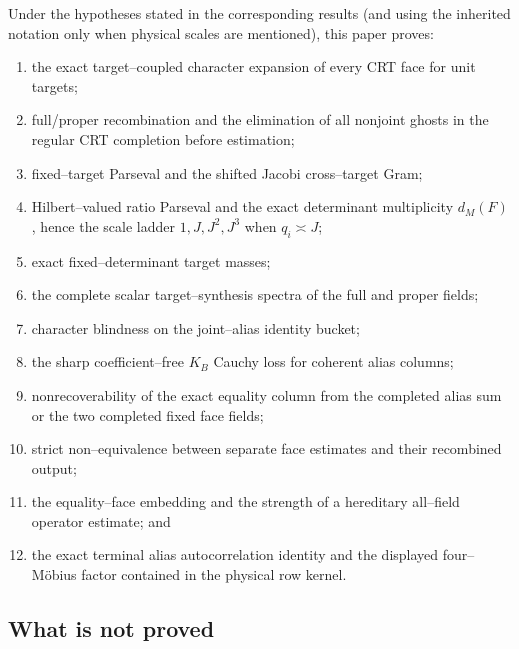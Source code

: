 Under the hypotheses stated in the corresponding results (and using the
inherited notation only when physical scales are mentioned), this paper
proves:
\begin{enumerate}[label=(\roman*)]
 \item the exact target--coupled character expansion of every CRT face for
 unit targets;
 \item full/proper recombination and the elimination of all nonjoint
 ghosts in the regular CRT completion before estimation;
 \item fixed--target Parseval and the shifted Jacobi cross--target Gram;
 \item Hilbert--valued ratio Parseval and the exact determinant multiplicity
 \(d_M(F)\), hence the scale ladder \(1,J,J^2,J^3\) when
 \(q_i\asymp J\);
 \item exact fixed--determinant target masses;
 \item the complete scalar target--synthesis spectra of the full and
 proper fields;
 \item character blindness on the joint--alias identity bucket;
 \item the sharp coefficient--free \(K_B\) Cauchy loss for coherent alias
 columns;
 \item nonrecoverability of the exact equality column from the completed
 alias sum or the two completed fixed face fields;
 \item strict non--equivalence between separate face estimates and their
 recombined output;
 \item the equality--face embedding and the strength of a hereditary
 all--field operator estimate; and
 \item the exact terminal alias autocorrelation identity and the displayed
 four--M\"obius factor contained in the physical row kernel.
\end{enumerate}

\subsection{What is not proved}

